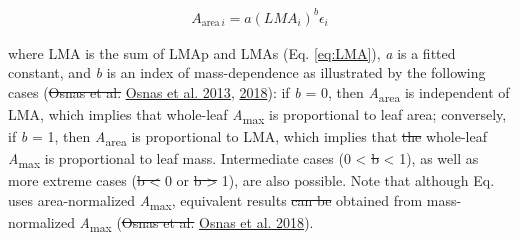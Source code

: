 \documentclass[
  12pt,
]{article}
\providecommand{\DIFaddtex}[1]{{\protect\color{blue}\uwave{#1}}} %
\providecommand{\DIFdeltex}[1]{{\protect\color{red}\sout{#1}}}                      %
\providecommand{\DIFaddbegin}{} %
\providecommand{\DIFaddend}{} %
\providecommand{\DIFdelbegin}{} %
\providecommand{\DIFdelend}{} %
\providecommand{\DIFadd}[1]{\texorpdfstring{\DIFaddtex{#1}}{#1}} %
\providecommand{\DIFdel}[1]{\texorpdfstring{\DIFdeltex{#1}}{}} %
\newcommand{\DIFscaledelfig}{0.5}
\newlength{\DIFdelgraphicswidth} %
\newlength{\DIFdelgraphicsheight} %
\newcommand{\DIFaddincludegraphics}[2][]{{\color{blue}\fbox{\DIFOincludegraphics[#1]{#2}}}} %
\newcommand{\DIFdelincludegraphics}[2][]{%
\sbox{\DIFdelgraphicsbox}{\DIFOincludegraphics[#1]{#2}}%
\settoboxwidth{\DIFdelgraphicswidth}{\DIFdelgraphicsbox} %
\settoboxtotalheight{\DIFdelgraphicsheight}{\DIFdelgraphicsbox} %
\scalebox{\DIFscaledelfig}{%
\parbox[b]{\DIFdelgraphicswidth}{\usebox{\DIFdelgraphicsbox}\\[-\baselineskip] \rule{\DIFdelgraphicswidth}{0em}}\llap{\resizebox{\DIFdelgraphicswidth}{\DIFdelgraphicsheight}{%
\setlength{\unitlength}{\DIFdelgraphicswidth}%
\begin{picture}(1,1)%
\thicklines\linethickness{2pt} %
{\color[rgb]{1,0,0}\put(0,0){\framebox(1,1){}}}%
{\color[rgb]{1,0,0}\put(0,0){\line( 1,1){1}}}%
{\color[rgb]{1,0,0}\put(0,1){\line(1,-1){1}}}%
\end{picture}%
}\hspace*{3pt}}} %
} %
\DeclareRobustCommand{\DIFaddbegin}{\DIFOaddbegin \let\includegraphics\DIFaddincludegraphics} %
\DeclareRobustCommand{\DIFaddend}{\DIFOaddend \let\includegraphics\DIFOincludegraphics} %
\DeclareRobustCommand{\DIFdelbegin}{\DIFOdelbegin \let\includegraphics\DIFdelincludegraphics} %
\DeclareRobustCommand{\DIFdelend}{\DIFOaddend \let\includegraphics\DIFOincludegraphics} %
\begin{document}
\begin{align}
A_{\mathrm{area} \, i} = a (LMA_i)^{b}\epsilon_i \DIFdelbegin %
\DIFdelend \DIFaddbegin \tag{8}
\DIFaddend \end{align}

where LMA is the sum of LMAp and LMAs (Eq. \eqref{eq:LMA}), \emph{a} is a fitted constant, and \emph{b} is an index of mass-dependence as illustrated by the following cases (\DIFdelbegin \DIFdel{Osnas et al. }\DIFdelend \protect\DIFdelbegin %
\DIFdelend \DIFaddbegin \hyperlink{ref-Osnas2013}{Osnas et al. 2013}\DIFaddend , \protect\hyperlink{ref-Osnas2018}{2018}): if \emph{b} = 0, then \emph{A}\textsubscript{area} is independent of LMA, which implies that whole-leaf \emph{A}\textsubscript{max} is proportional to leaf area; conversely, if \emph{b} = 1, then \emph{A}\textsubscript{area} is proportional to LMA, which implies that \DIFdelbegin \DIFdel{the }\DIFdelend whole-leaf \emph{A}\textsubscript{max} is proportional to leaf mass.
Intermediate cases (0 \textless{} \DIFdelbegin \DIFdel{b }\DIFdelend \DIFaddbegin \emph{\DIFadd{b}} \DIFaddend \textless{} 1), as well as more extreme cases (\DIFdelbegin \DIFdel{b \textless{} }\DIFdelend \DIFaddbegin \emph{\DIFadd{b}} \DIFadd{\(\leq\) }\DIFaddend 0 or \DIFdelbegin \DIFdel{b \textgreater{} }\DIFdelend \DIFaddbegin \emph{\DIFadd{b}} \DIFadd{\(\geq\) }\DIFaddend 1), are also possible.
Note that although Eq. \DIFdelbegin %
\DIFdelend \DIFaddbegin \DIFadd{8 }\DIFaddend uses area-normalized \emph{A}\textsubscript{max}, equivalent results \DIFdelbegin \DIFdel{can be }\DIFdelend \DIFaddbegin \DIFadd{are }\DIFaddend obtained from mass-normalized \emph{A}\textsubscript{max} (\DIFdelbegin \DIFdel{Osnas et al. }\DIFdelend \protect\DIFdelbegin %
\DIFdelend \DIFaddbegin \hyperlink{ref-Osnas2018}{Osnas et al. 2018}\DIFaddend ).
\end{document}
